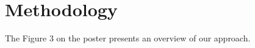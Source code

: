 \documentclass[10pt, conference]{IEEEtran} %
\begin{document}


\section{Methodology}
The Figure 3 on the poster presents an overview of our approach. 
\vspace{-0.15in}
\end{document}
